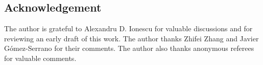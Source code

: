 \documentclass[11pt]{article}
\theoremstyle{definition}
\theoremstyle{remark}
\numberwithin{equation}{section}
\begin{document}
\subsection*{Acknowledgement}
The author is grateful to Alexandru D. Ionescu for valuable discussions and for reviewing an early draft of this work. The author thanks Zhifei Zhang and Javier G\'{o}mez-Serrano for their comments. The author also thanks anonymous referees for valuable comments.


\end{document}
